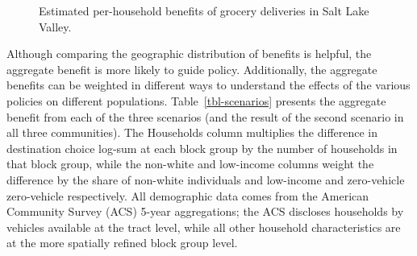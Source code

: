 \documentclass[
  letterpaper,
  number,
  review,
  3p]{elsarticle}
\begin{document}
\begin{figure}


\caption{\label{fig-s4results}Estimated per-household benefits of
grocery deliveries in Salt Lake Valley.}

\end{figure}%

\begin{table}

\caption{\label{tbl-scenarios}Scenario Benefits}


\end{table}%

Although comparing the geographic distribution of benefits is helpful,
the aggregate benefit is more likely to guide policy. Additionally, the
aggregate benefits can be weighted in different ways to understand the
effects of the various policies on different populations.
Table~\ref{tbl-scenarios} presents the aggregate benefit from each of
the three scenarios (and the result of the second scenario in all three
communities). The Households column multiplies the difference in
destination choice log-sum at each block group by the number of
households in that block group, while the non-white and low-income
columns weight the difference by the share of non-white individuals and
low-income and zero-vehicle zero-vehicle respectively. All demographic
data comes from the American Community Survey (ACS) 5-year aggregations;
the ACS discloses households by vehicles available at the tract level,
while all other household characteristics are at the more spatially
refined block group level.
\end{document}

